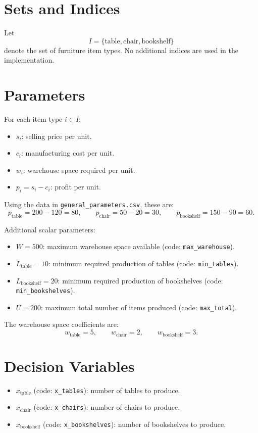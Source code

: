 \section*{Sets and Indices}

Let
\[
I=\{\text{table},\text{chair},\text{bookshelf}\}
\]
denote the set of furniture item types. No additional indices are used in the implementation.

\section*{Parameters}

For each item type \(i \in I\):
\begin{itemize}
    \item \(s_i\): selling price per unit.
    \item \(c_i\): manufacturing cost per unit.
    \item \(w_i\): warehouse space required per unit.
    \item \(p_i = s_i - c_i\): profit per unit.
\end{itemize}

Using the data in \texttt{general\_parameters.csv}, these are:
\[
p_{\text{table}} = 200-120 = 80,\qquad
p_{\text{chair}} = 50-20 = 30,\qquad
p_{\text{bookshelf}} = 150-90 = 60.
\]

Additional scalar parameters:
\begin{itemize}
    \item \(W = 500\): maximum warehouse space available (code: \texttt{max\_warehouse}).
    \item \(L_{\text{table}} = 10\): minimum required production of tables (code: \texttt{min\_tables}).
    \item \(L_{\text{bookshelf}} = 20\): minimum required production of bookshelves (code: \texttt{min\_bookshelves}).
    \item \(U = 200\): maximum total number of items produced (code: \texttt{max\_total}).
\end{itemize}

The warehouse space coefficients are:
\[
w_{\text{table}}=5,\qquad w_{\text{chair}}=2,\qquad w_{\text{bookshelf}}=3.
\]

\section*{Decision Variables}

\begin{itemize}
    \item \(x_{\text{table}}\) (code: \texttt{x\_tables}): number of tables to produce.
    \item \(x_{\text{chair}}\) (code: \texttt{x\_chairs}): number of chairs to produce.
    \item \(x_{\text{bookshelf}}\) (code: \texttt{x\_bookshelves}): number of bookshelves to produce.
\end{itemize}

